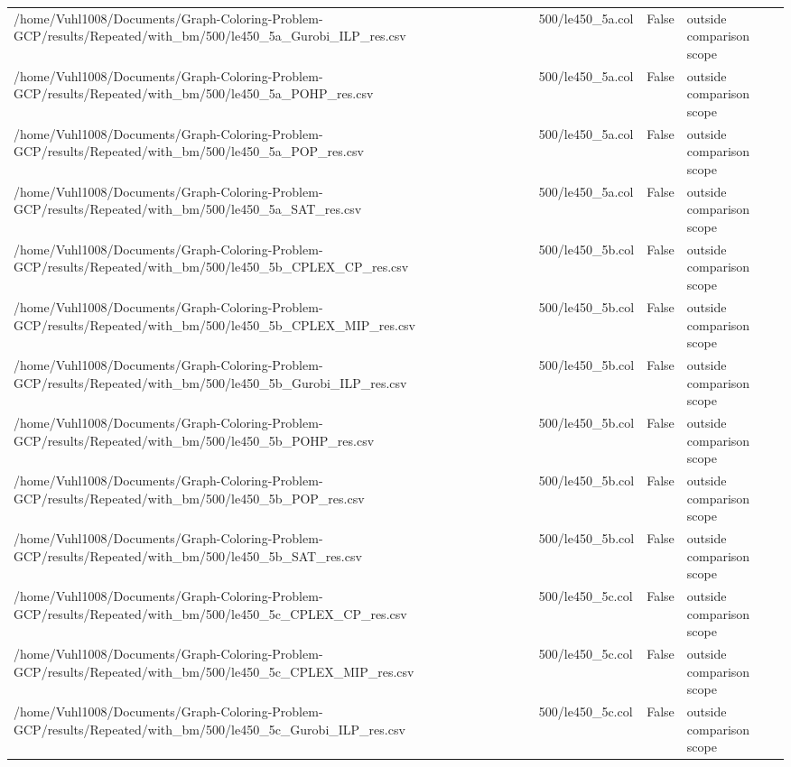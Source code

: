 \begin{table}[htbp]
\begin{tabular}{llll}
/home/Vuhl1008/Documents/Graph-Coloring-Problem-GCP/results/Repeated/with\_bm/500/le450\_5a\_Gurobi\_ILP\_res.csv & 500/le450\_5a.col & False & outside comparison scope \\
/home/Vuhl1008/Documents/Graph-Coloring-Problem-GCP/results/Repeated/with\_bm/500/le450\_5a\_POHP\_res.csv & 500/le450\_5a.col & False & outside comparison scope \\
/home/Vuhl1008/Documents/Graph-Coloring-Problem-GCP/results/Repeated/with\_bm/500/le450\_5a\_POP\_res.csv & 500/le450\_5a.col & False & outside comparison scope \\
/home/Vuhl1008/Documents/Graph-Coloring-Problem-GCP/results/Repeated/with\_bm/500/le450\_5a\_SAT\_res.csv & 500/le450\_5a.col & False & outside comparison scope \\
/home/Vuhl1008/Documents/Graph-Coloring-Problem-GCP/results/Repeated/with\_bm/500/le450\_5b\_CPLEX\_CP\_res.csv & 500/le450\_5b.col & False & outside comparison scope \\
/home/Vuhl1008/Documents/Graph-Coloring-Problem-GCP/results/Repeated/with\_bm/500/le450\_5b\_CPLEX\_MIP\_res.csv & 500/le450\_5b.col & False & outside comparison scope \\
/home/Vuhl1008/Documents/Graph-Coloring-Problem-GCP/results/Repeated/with\_bm/500/le450\_5b\_Gurobi\_ILP\_res.csv & 500/le450\_5b.col & False & outside comparison scope \\
/home/Vuhl1008/Documents/Graph-Coloring-Problem-GCP/results/Repeated/with\_bm/500/le450\_5b\_POHP\_res.csv & 500/le450\_5b.col & False & outside comparison scope \\
/home/Vuhl1008/Documents/Graph-Coloring-Problem-GCP/results/Repeated/with\_bm/500/le450\_5b\_POP\_res.csv & 500/le450\_5b.col & False & outside comparison scope \\
/home/Vuhl1008/Documents/Graph-Coloring-Problem-GCP/results/Repeated/with\_bm/500/le450\_5b\_SAT\_res.csv & 500/le450\_5b.col & False & outside comparison scope \\
/home/Vuhl1008/Documents/Graph-Coloring-Problem-GCP/results/Repeated/with\_bm/500/le450\_5c\_CPLEX\_CP\_res.csv & 500/le450\_5c.col & False & outside comparison scope \\
/home/Vuhl1008/Documents/Graph-Coloring-Problem-GCP/results/Repeated/with\_bm/500/le450\_5c\_CPLEX\_MIP\_res.csv & 500/le450\_5c.col & False & outside comparison scope \\
/home/Vuhl1008/Documents/Graph-Coloring-Problem-GCP/results/Repeated/with\_bm/500/le450\_5c\_Gurobi\_ILP\_res.csv & 500/le450\_5c.col & False & outside comparison scope \\

\end{tabular}
\end{table}
